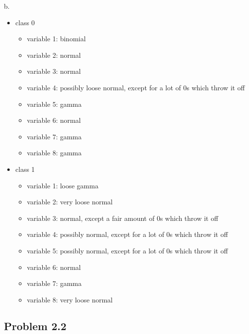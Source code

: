 \documentclass[a4paper]{article}
\begin{document}
\noindent
b.
\begin{itemize}
    \item class 0
    \begin{itemize}
        \item variable 1: binomial
        \item variable 2: normal
        \item variable 3: normal
        \item variable 4: possibly loose normal, except for a lot of 0s which throw it off
        \item variable 5: gamma
        \item variable 6: normal
        \item variable 7: gamma
        \item variable 8: gamma
    \end{itemize}
    \item class 1
    \begin{itemize}
        \item variable 1: loose gamma
        \item variable 2: very loose normal
        \item variable 3: normal, except a fair amount of 0s which throw it off
        \item variable 4: possibly normal, except for a lot of 0s which throw it off
        \item variable 5: possibly normal, except for a lot of 0s which throw it off
        \item variable 6: normal
        \item variable 7: gamma
        \item variable 8: very loose normal
    \end{itemize}
\end{itemize}



\subsection{Problem 2.2}
\end{document}

